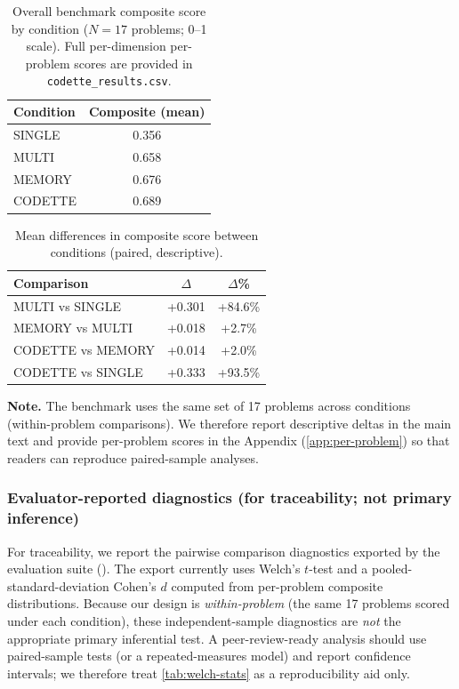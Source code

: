 \documentclass[11pt,a4paper]{article}
\begin{document}
\begin{table}[ht]
\centering
\caption{Overall benchmark composite score by condition ($N=17$ problems; 0--1 scale). Full per-dimension per-problem scores are provided in \texttt{codette\_results.csv}.}
\label{tab:results}
\begin{tabular}{lc}
\toprule
\textbf{Condition} & \textbf{Composite (mean)} \\
\midrule
SINGLE  & 0.356 \\
MULTI   & 0.658 \\
MEMORY  & 0.676 \\
CODETTE & 0.689 \\
\bottomrule
\end{tabular}
\end{table}
\begin{table}[ht]
\centering
\caption{Mean differences in composite score between conditions (paired, descriptive).}
\label{tab:statistics}
\begin{tabular}{lcc}
\toprule
\textbf{Comparison} & \textbf{$\Delta$} & \textbf{$\Delta$\%} \\
\midrule
MULTI vs SINGLE             & +0.301 & +84.6\% \\
MEMORY vs MULTI             & +0.018 & +2.7\%  \\
CODETTE vs MEMORY           & +0.014 & +2.0\%  \\
CODETTE vs SINGLE           & +0.333 & +93.5\% \\
\bottomrule
\end{tabular}
\end{table}


\noindent\textbf{Note.} The benchmark uses the same set of 17 problems across conditions (within-problem comparisons). We therefore report descriptive deltas in the main text and provide per-problem scores in the Appendix (\cref{app:per-problem}) so that readers can reproduce paired-sample analyses.

\subsubsection{Evaluator-reported diagnostics (for traceability; not primary inference)}
For traceability, we report the pairwise comparison diagnostics exported by the evaluation suite (). The export currently uses Welch's $t$-test and a pooled-standard-deviation Cohen's $d$ computed from per-problem composite distributions. Because our design is \emph{within-problem} (the same 17 problems scored under each condition), these independent-sample diagnostics are \emph{not} the appropriate primary inferential test. A peer-review-ready analysis should use paired-sample tests (or a repeated-measures model) and report confidence intervals; we therefore treat \cref{tab:welch-stats} as a reproducibility aid only.
\end{document}

